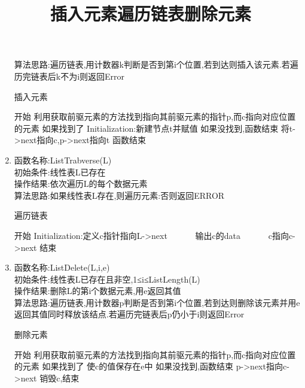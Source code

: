\documentclass[supercite]{HustGraduPaper}
\theoremstyle{definition}
\begin{document}
\begin{enumerate}
	      算法思路:遍历链表,用计数器k判断是否到第i个位置,若到达则插入该元素.若遍历完链表后k不为i则返回Error
	      \begin{algorithm}[htb]
		      \title{插入元素}
		      \caption{插入元素}
		      \begin{algorithmic}[1]
			      \State 开始
			      \State 利用获取前驱元素的方法找到指向其前驱元素的指针p,而c指向对应位置的元素
			      \State 如果找到了 Initialization:新建节点t并赋值 如果没找到,函数结束
			      \State 将t->next指向c,p->next指向t
			      \State 函数结束
		      \end{algorithmic}\label{L10}
	      \end{algorithm}
	\item 函数名称:ListTrabverse(L)\\
	      初始条件:线性表L已存在\\
	      操作结果:依次遍历L的每个数据元素\\
	      算法思路:如果线性表L存在,则遍历元素:否则返回ERROR
	      \begin{algorithm}[htb]
		      \title{遍历链表}
		      \caption{遍历链表}
		      \begin{algorithmic}[1]
			      \State 开始
			      \State Initialization:定义c指针指向L->next
			      ~~~~~~\State 输出c的data
			      ~~~~~~\State c指向c->next
			      \EndWhile
			      \State 结束
		      \end{algorithmic}\label{L12}
	      \end{algorithm}
	      \newpage
	\item 函数名称:ListDelete(L,i,e)\\
	      初始条件:线性表L已存在且非空,1≤i≤ListLength(L)\\
	      操作结果:删除L的第i个数据元素,用e返回其值\\
	      算法思路:遍历链表,用计数器p判断是否到第i个位置,若到达则删除该元素并用e返回其值同时释放该结点.若遍历完链表后p仍小于i则返回Error
	      \begin{algorithm}[htb]
		      \title{删除元素}
		      \caption{删除元素}
		      \begin{algorithmic}[1]
			      \State 开始
			      \State 利用获取前驱元素的方法找到指向其前驱元素的指针p,而c指向对应位置的元素
			      \State 如果找到了 使c的值保存在e中 如果没找到,函数结束
			      \State p->next指向c->next
			      \State 销毁c,结束
		      \end{algorithmic}\label{L11}
	      \end{algorithm}


\end{enumerate}
\end{document}
